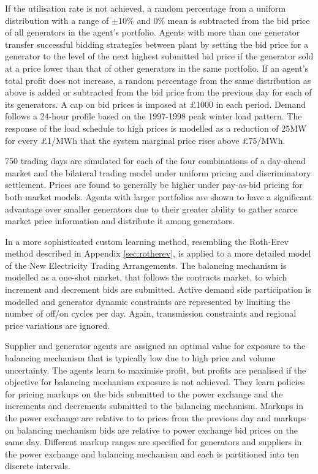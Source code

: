 If the utilisation rate is not achieved, a random percentage from a uniform
distribution with a range of $\pm10\%$ and $0\%$ mean is subtracted from the
bid price of all generators in the agent's portfolio.  Agents with more than one generator
transfer successful bidding strategies between plant by setting the
bid price for a generator to the level of the next highest submitted bid price if
the generator sold at a price lower than that of other generators in the same
portfolio.  If an agent's total profit does not increase, a random percentage
from the same distribution as above is added or subtracted from the bid price
from the previous day for each of its generators.  A cap on bid prices is
imposed at \pounds1000 in each period.  Demand follows a 24-hour profile based
on the 1997-1998 peak winter load pattern.  The response of the load schedule
to high prices is modelled as a reduction of 25MW for every \pounds1/MWh that
the system marginal price rises above \pounds75/MWh.

750 trading days are simulated for each of the four combinations of a day-ahead
market and the bilateral trading model under uniform pricing and discriminatory
settlement.  Prices are found to generally be higher under pay-as-bid pricing
for both market models.  Agents with larger portfolios are shown to have a
significant advantage over smaller generators due to their greater ability to
gather scarce market price information and distribute it among generators.

In  a more sophisticated custom learning method, resembling
the Roth-Erev method described in Appendix \ref{sec:rotherev}, is applied to a
more detailed model of the New Electricity Trading Arrangements.  The balancing
mechanism is modelled as a one-shot market, that follows the contracts market,
to which increment and decrement bids are submitted.  Active demand side
participation is modelled and generator dynamic constraints are represented by
limiting the number of off/on cycles per day.  Again, transmission constraints
and regional price variations are ignored.

Supplier and generator agents are assigned an optimal value for
exposure to the balancing mechanism that is typically low due to high price and
volume uncertainty.  The agents learn to maximise profit, but profits are
penalised if the objective for balancing mechanism exposure is not
achieved.  They learn policies for pricing markups on the bids submitted
to the power exchange and the increments and decrements submitted to the
balancing mechanism.  Markups in the power exchange are relative to to prices
from the previous day and markups on balancing mechanism bids are relative to
power exchange bid prices on the same day.  Different markup
ranges are specified for generators and suppliers in the power exchange and
balancing mechanism and each is partitioned into ten discrete intervals.

